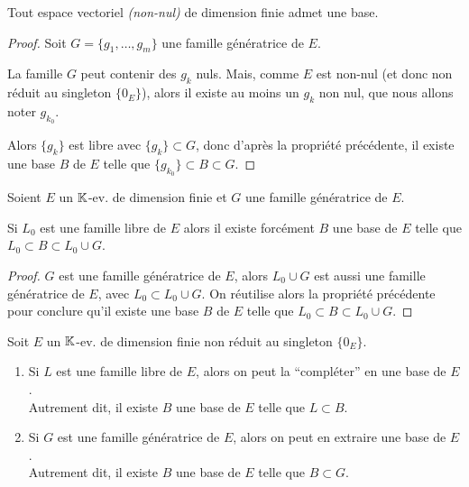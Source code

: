 \documentclass[12pt, a4paper]{report}
\begin{document}
\begin{remark}
    Tout espace vectoriel \textit{(non-nul)} de dimension finie admet une base.
    \label{rem:ev_dim_finie_admet_base}
\end{remark}

\begin{proof}
    Soit $G = \{g_1,\dots,g_m\}$ une famille génératrice de $E$.

    La famille $G$ peut contenir des $g_k$ nuls. Mais, comme $E$ est non-nul (et donc non réduit au singleton $\{0_E\}$), alors il existe au moins un $g_k$ non nul, que nous allons noter $g_{k_0}$.

    Alors $\{g_k\}$ est libre avec $\{g_k\} \subset G$, donc d'après la propriété précédente, il existe une base $B$ de $E$ telle que $\{g_{k_0}\} \subset B \subset G$.
\end{proof}

\begin{property}
    Soient $E$ un $\mathbb{K}$-ev. de dimension finie et $G$ une famille génératrice de $E$.

    Si $L_0$ est une famille libre de $E$ alors il existe forcément $B$ une base de $E$ telle que $L_0 \subset B \subset L_0\cup G$.
    \label{prop:base_incomplete_famille_libre}
\end{property}

\begin{proof}
    $G$ est une famille génératrice de $E$, alors $L_0 \cup G$ est aussi une famille génératrice de $E$, avec $L_0 \subset L_0 \cup G$. On réutilise alors la propriété précédente pour conclure qu'il existe une base $B$ de $E$ telle que $L_0 \subset B \subset L_0 \cup G$.
\end{proof}

\begin{theorem}
    Soit $E$ un $\mathbb{K}$-ev. de dimension finie non réduit au singleton $\{0_E\}$.
    \begin{enumerate}
        \item Si $L$ est une famille libre de $E$, alors on peut la ``compléter'' en une base de $E$.\\Autrement dit, il existe $B$ une base de $E$ telle que $L \subset B$.
        \item Si $G$ est une famille génératrice de $E$, alors on peut en extraire une base de $E$.\\Autrement dit, il existe $B$ une base de $E$ telle que $B \subset G$.
    \end{enumerate}
    \label{thm:base_incomplete}
\end{theorem}
\end{document}
